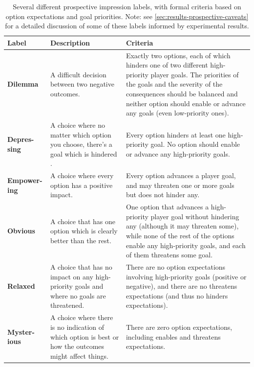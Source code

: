 \begin{table}[!p]
\begingroup
\renewcommand*{\arraystretch}{1.5}
\begin{tabular}{p{4.5em}p{10em}p{18.5em}}
\toprule
\textbf{Label} & \textbf{Description} & \textbf{Criteria} \\
\midrule
\textbf{Dilemma} & A difficult decision between two negative outcomes. & Exactly two options, each of which hinders one of two different high-priority player goals. The priorities of the goals and the severity of the consequences should be balanced and neither option should enable or advance any goals (even low-priority ones). \\
\textbf{Depres-sing} & A choice where no matter which option you choose, there's a goal which is hindered . & Every option hinders at least one high-priority goal. No option should enable or advance any high-priority goals. \\
\textbf{Empower-ing} & A choice where every option has a positive impact. & Every option advances a player goal, and may threaten one or more goals but does not hinder any. \\
\textbf{Obvious} & A choice that has one option which is clearly better than the rest. & One option that advances a high-priority player goal without hindering any (although it may threaten some), while none of the rest of the options enable any high-priority goals, and each of them threatens some goal. \\
\textbf{Relaxed} & A choice that has no impact on any high-priority goals and where no goals are threatened. & There are no option expectations involving high-priority goals (positive or negative), and there are no threatens expectations (and thus no hinders expectations). \\
\textbf{Myster-ious} & A choice where there is no indication of which option is best or how the outcomes might affect things. & There are zero option expectations, including enables and threatens expectations. \\
\bottomrule
\end{tabular}
\endgroup
\caption[Prospective choice impressions]{Several different prospective impression labels, with formal criteria based on option expectations and goal priorities. Note: see \cref{sec:results-prospective-caveats} for a detailed discussion of some of these labels informed by experimental results.}
\label{tab:prospective-impressions}
\end{table}



